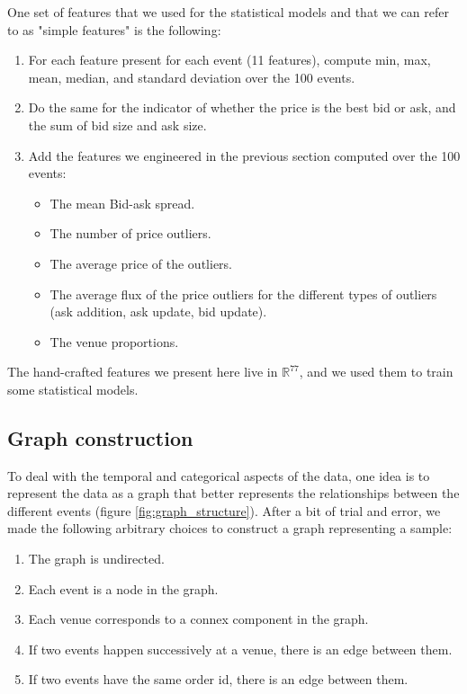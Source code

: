 \documentclass[switch, 11pt]{article}
\newcommand{\R}{\mathbb{R}}
\begin{document}
\begin{multicols}{2}
    One set of features that we used for the statistical models and that we can refer to as "simple features" is the following:
    \begin{enumerate}
        \item For each feature present for each event (11 features), compute min, max, mean, median, and standard deviation over the 100 events.
        \item Do the same for the indicator of whether the price is the best bid or ask, and the sum of bid size and ask size.
        \item Add the features we engineered in the previous section computed over the 100 events:
              \begin{itemize}
                  \item The mean Bid-ask spread.
                  \item The number of price outliers.
                  \item The average price of the outliers.
                  \item The average flux of the price outliers for the different types of outliers (ask addition, ask update, bid update).
                  \item The venue proportions.
              \end{itemize}
    \end{enumerate}
    The hand-crafted features we present here live in $\R^{77}$, and we used them to train some statistical models.

    \subsection{Graph construction}

    To deal with the temporal and categorical aspects of the data, one idea is to represent the data as a graph that better represents the relationships between the different events (figure \ref{fig:graph_structure}). After a bit of trial and error, we made the following arbitrary choices to construct a graph representing a sample:
    \begin{enumerate}
        \item The graph is undirected.
        \item Each event is a node in the graph.
        \item Each venue corresponds to a connex component in the graph.
        \item If two events happen successively at a venue, there is an edge between them.
        \item If two events have the same order id, there is an edge between them.
    \end{enumerate}


\end{multicols}
\end{document}
